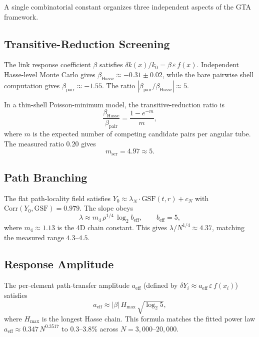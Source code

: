 \documentclass[12pt,a4paper]{article}
\begin{document}
A single combinatorial constant organizes three independent aspects of the GTA framework.

\subsection{Transitive-Reduction Screening}

The link response coefficient $\beta$ satisfies $\delta k(x)/k_0 = \beta\,\varepsilon\,f(x)$. Independent Hasse-level Monte Carlo gives $\beta_{\mathrm{Hasse}} \approx -0.31 \pm 0.02$, while the bare pairwise shell computation gives $\beta_{\mathrm{pair}} \approx -1.55$. The ratio $|\beta_{\mathrm{pair}}/\beta_{\mathrm{Hasse}}| \approx 5$.

In a thin-shell Poisson-minimum model, the transitive-reduction ratio is
\begin{equation}\label{eq:tr}
  \frac{\beta_{\mathrm{Hasse}}}{\beta_{\mathrm{pair}}} = \frac{1 - e^{-m}}{m},
\end{equation}
where $m$ is the expected number of competing candidate pairs per angular tube. The measured ratio $0.20$ gives
\begin{equation}
  \boxed{m_{\mathrm{scr}} = 4.97 \approx 5.}
\end{equation}

\subsection{Path Branching}

The flat path-locality field satisfies $Y_0 \approx \lambda_N \cdot \mathrm{GSF}(t,r) + c_N$ with $\mathrm{Corr}(Y_0, \mathrm{GSF}) = 0.979$. The slope obeys
\begin{equation}\label{eq:lambda}
  \lambda \approx m_4\,\rho^{1/4}\,\log_2 b_{\mathrm{eff}}, \qquad b_{\mathrm{eff}} = 5,
\end{equation}
where $m_4 \approx 1.13$ is the 4D chain constant. This gives $\lambda/N^{1/4} \approx 4.37$, matching the measured range $4.3$--$4.5$.

\subsection{Response Amplitude}

The per-element path-transfer amplitude $a_{\mathrm{eff}}$ (defined by $\delta Y_i \approx a_{\mathrm{eff}}\,\varepsilon\,f(x_i)$) satisfies
\begin{equation}\label{eq:aeff}
  \boxed{a_{\mathrm{eff}} \approx |\beta|\,H_{\max}\,\sqrt{\log_2 5},}
\end{equation}
where $H_{\max}$ is the longest Hasse chain. This formula matches the fitted power law $a_{\mathrm{eff}} \approx 0.347\,N^{0.3517}$ to $0.3$--$3.8\%$ across $N = 3{,}000$--$20{,}000$.
\end{document}
